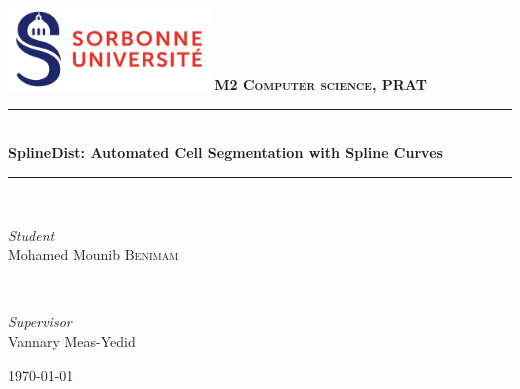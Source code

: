 \documentclass[a4paper, 12pt]{report}
\begin{document}
\begin{titlepage} 
	\newcommand{\HRule}{\rule{\linewidth}{0.5mm}} %
	\center %
	
    \includegraphics[width=0.4\textwidth]{logo.png}
	\vfill
	\textsc{\large{ \textbf{M2 Computer science, PRAT}\\[0.5cm] }} %
	
	
	\HRule\\[0.4cm]
	
	{\LARGE\bfseries SplineDist: Automated Cell Segmentation with Spline Curves}\\[0.1cm] %
	
	\HRule\\[1.5cm]
	
	
	\begin{minipage}{0.45\textwidth}
		\begin{flushleft}
			\large
			\textit{Student}\\
			Mohamed Mounib \textsc{Benimam}
		\end{flushleft}
	\end{minipage}
    ~~
	\begin{minipage}{0.45\textwidth}
		\begin{flushright}
			\large
			\textit{Supervisor}\\
			Vannary Meas-Yedid
		\end{flushright}
	\end{minipage}
	
	
	\vfill\vfill\vfill %
	
	{\large\today} 
	
	
	\vfill 
	
\end{titlepage}
\end{document}
